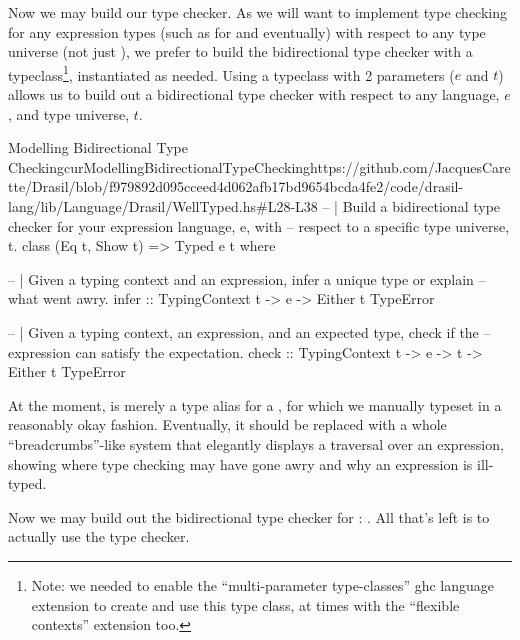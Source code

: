 Now we may build our type checker. As we will want to implement type checking
for any expression types (such as for \CodeExpr{} and \ModelExpr{} eventually)
with respect to any type universe (not just \Space{}), we prefer to build the
bidirectional type checker with a typeclass\footnote{Note: we needed to enable
the ``multi-parameter type-classes'' \cite{GHC2020MultiParamTypeClasses}
\acs{ghc} language extension to create and use this type class, at times with
the ``flexible contexts'' \cite{GHC2020FlexibleContexts} extension too.},
instantiated as needed. Using a typeclass with 2 parameters (\(e\) and \(t\))
allows us to build out a bidirectional type checker with respect to any
language, \(e\), and type universe, \(t\).

\begin{haskell}{Modelling Bidirectional Type Checking}{curModellingBidirectionalTypeChecking}{https://github.com/JacquesCarette/Drasil/blob/f979892d095cceed4d062afb17bd9654bcda4fe2/code/drasil-lang/lib/Language/Drasil/WellTyped.hs\#L28-L38}
-- | Build a bidirectional type checker for your expression language, e, with
--   respect to a specific type universe, t.
class (Eq t, Show t) => Typed e t where
  
  -- | Given a typing context and an expression, infer a unique type or explain
  --   what went awry.
  infer :: TypingContext t -> e -> Either t TypeError


  -- | Given a typing context, an expression, and an expected type, check if the
  --   expression can satisfy the expectation.
  check :: TypingContext t -> e -> t -> Either t TypeError
\end{haskell}

At the moment,  is merely a type alias for a
, for which we manually typeset in a reasonably okay fashion.
Eventually, it should be replaced with a whole ``breadcrumbs''-like system that
elegantly displays a traversal over an expression, showing where type checking
may have gone awry and why an expression is ill-typed.

Now we may build out the bidirectional type checker for \Expr{}:
. All that's left is to actually use
the type checker.


